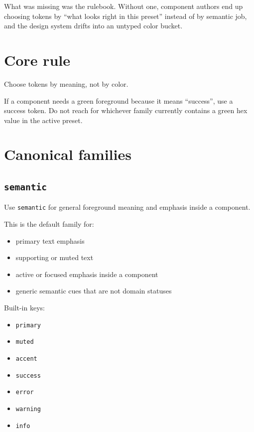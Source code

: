 What was missing was the rulebook. Without one, component authors end up choosing tokens by ``what looks right in this preset'' instead of by semantic job, and the design system drifts into an untyped color bucket.

\section{Core rule}\label{record-028-core-rule}

Choose tokens by meaning, not by color.

If a component needs a green foreground because it means ``success'', use a success token. Do not reach for whichever family currently contains a green hex value in the active preset.

\section{Canonical families}\label{record-028-canonical-families}

\subsection{\texorpdfstring{\texttt{s\allowbreak{}e\allowbreak{}m\allowbreak{}a\allowbreak{}n\allowbreak{}t\allowbreak{}i\allowbreak{}c}}{}}\label{record-028-semantic}

Use \texttt{s\allowbreak{}e\allowbreak{}m\allowbreak{}a\allowbreak{}n\allowbreak{}t\allowbreak{}i\allowbreak{}c} for general foreground meaning and emphasis inside a component.

This is the default family for:

\begin{itemize}
\tightlist
\item
  primary text emphasis
\item
  supporting or muted text
\item
  active or focused emphasis inside a component
\item
  generic semantic cues that are not domain statuses
\end{itemize}

Built-in keys:

\begin{itemize}
\tightlist
\item
  \texttt{p\allowbreak{}r\allowbreak{}i\allowbreak{}m\allowbreak{}a\allowbreak{}r\allowbreak{}y}
\item
  \texttt{m\allowbreak{}u\allowbreak{}t\allowbreak{}e\allowbreak{}d}
\item
  \texttt{a\allowbreak{}c\allowbreak{}c\allowbreak{}e\allowbreak{}n\allowbreak{}t}
\item
  \texttt{s\allowbreak{}u\allowbreak{}c\allowbreak{}c\allowbreak{}e\allowbreak{}s\allowbreak{}s}
\item
  \texttt{e\allowbreak{}r\allowbreak{}r\allowbreak{}o\allowbreak{}r}
\item
  \texttt{w\allowbreak{}a\allowbreak{}r\allowbreak{}n\allowbreak{}i\allowbreak{}n\allowbreak{}g}
\item
  \texttt{i\allowbreak{}n\allowbreak{}f\allowbreak{}o}
\end{itemize}

